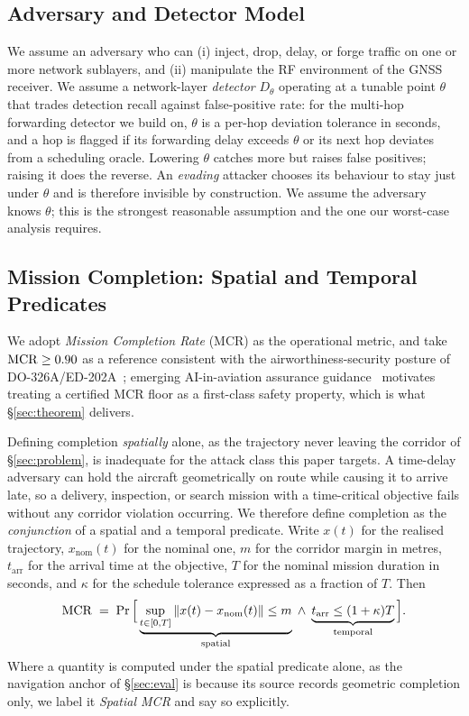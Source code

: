 \subsection{Adversary and Detector Model}
\label{sec:adversary}
We assume an adversary who can (i) inject, drop, delay, or forge traffic on one
or more network sublayers, and (ii) manipulate the RF environment of the GNSS
receiver. We assume a network-layer \emph{detector} $D_\theta$ operating at a
tunable point $\theta$ that trades detection recall against false-positive rate:
for the multi-hop forwarding detector we build on, $\theta$ is a per-hop
deviation tolerance in seconds, and a hop is flagged if its forwarding delay
exceeds $\theta$ or its next hop deviates from a scheduling oracle. Lowering
$\theta$ catches more but raises false positives; raising it does the reverse.
An \emph{evading} attacker chooses its behaviour to stay just under $\theta$ and
is therefore invisible by construction. We assume the adversary knows $\theta$;
this is the strongest reasonable assumption and the one our worst-case analysis
requires.

\subsection{Mission Completion: Spatial and Temporal Predicates}
\label{sec:mcr}
We adopt \emph{Mission Completion Rate} (MCR) as the operational metric, and
take $\mathrm{MCR}\ge0.90$ as a reference consistent with the airworthiness-security
posture of DO-326A/ED-202A~\cite{do326a}; emerging AI-in-aviation assurance
guidance~\cite{ed324} motivates treating a certified MCR floor as a first-class
safety property, which is what \S\ref{sec:theorem} delivers.

Defining completion \emph{spatially} alone, as the trajectory never leaving the
corridor of \S\ref{sec:problem}, is inadequate for the attack class this paper
targets. A time-delay adversary can hold the aircraft geometrically on route
while causing it to arrive late, so a delivery, inspection, or search mission
with a time-critical objective fails without any corridor violation occurring.
We therefore define completion as the \emph{conjunction} of a spatial and a
temporal predicate. Write $x(t)$ for the realised trajectory,
$x_{\mathrm{nom}}(t)$ for the nominal one, $m$ for the corridor margin in
metres, $t_{\mathrm{arr}}$ for the arrival time at the objective, $T$ for the
nominal mission duration in seconds, and $\kappa$ for the schedule tolerance
expressed as a fraction of $T$. Then
\begin{equation}
\label{eq:mcr}
\mathrm{MCR} \;=\; \Pr\Big[\underbrace{\sup_{t\in[0,T]}\left\lVert x(t)-x_{\mathrm{nom}}(t)\right\rVert\le m}_{\text{spatial}}
\;\wedge\;
\underbrace{t_{\mathrm{arr}}\le(1+\kappa)T}_{\text{temporal}}\Big].
\end{equation}
Where a quantity is computed under the spatial predicate alone, as the
navigation anchor of \S\ref{sec:eval} is because its source records geometric
completion only, we label it \emph{Spatial MCR} and say so explicitly.

